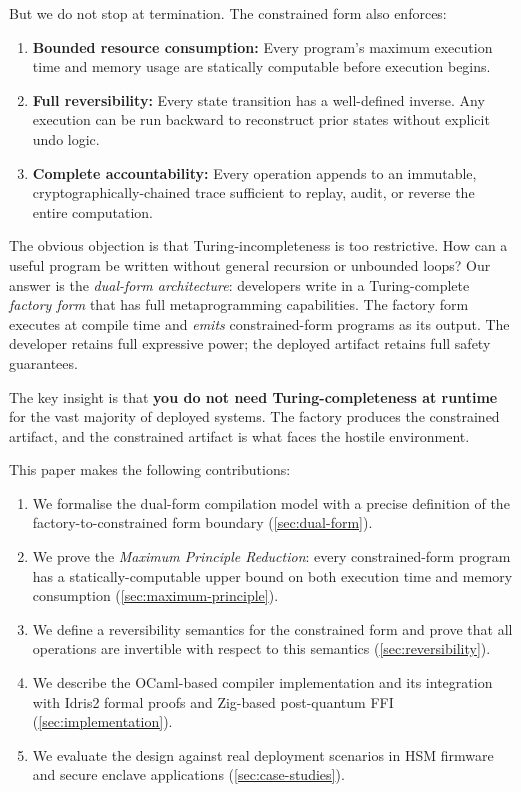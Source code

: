 \documentclass[11pt,a4paper]{article}
\begin{document}
But we do not stop at termination.  The constrained form also enforces:

\begin{enumerate}[nosep]
  \item \textbf{Bounded resource consumption:}  Every program's maximum
    execution time and memory usage are statically computable before execution
    begins.
  \item \textbf{Full reversibility:}  Every state transition has a
    well-defined inverse.  Any execution can be run backward to reconstruct
    prior states without explicit undo logic.
  \item \textbf{Complete accountability:}  Every operation appends to an
    immutable, cryptographically-chained trace sufficient to replay, audit, or
    reverse the entire computation.
\end{enumerate}

The obvious objection is that Turing-incompleteness is too restrictive.  How
can a useful program be written without general recursion or unbounded loops?
Our answer is the \emph{dual-form architecture}: developers write in a
Turing-complete \emph{factory form} that has full metaprogramming
capabilities.  The factory form executes at compile time and \emph{emits}
constrained-form programs as its output.  The developer retains full
expressive power; the deployed artifact retains full safety guarantees.

The key insight is that \textbf{you do not need Turing-completeness at
runtime} for the vast majority of deployed systems.  The factory produces the
constrained artifact, and the constrained artifact is what faces the hostile
environment.

This paper makes the following contributions:

\begin{enumerate}[nosep]
  \item We formalise the dual-form compilation model with a precise definition
    of the factory-to-constrained form boundary (\cref{sec:dual-form}).
  \item We prove the \emph{Maximum Principle Reduction}: every constrained-form
    program has a statically-computable upper bound on both execution time and
    memory consumption (\cref{sec:maximum-principle}).
  \item We define a reversibility semantics for the constrained form and prove
    that all operations are invertible with respect to this semantics
    (\cref{sec:reversibility}).
  \item We describe the OCaml-based compiler implementation and its integration
    with Idris2 formal proofs and Zig-based post-quantum FFI
    (\cref{sec:implementation}).
  \item We evaluate the design against real deployment scenarios in HSM
    firmware and secure enclave applications (\cref{sec:case-studies}).
\end{enumerate}
\end{document}
